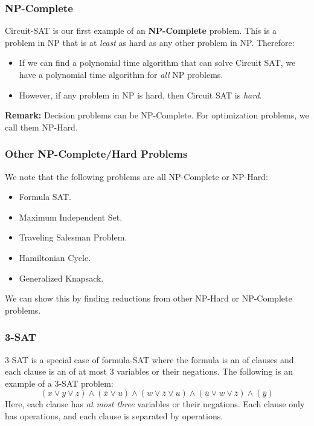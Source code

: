 \documentclass[letterpaper]{article}
\begin{document}
\subsubsection{NP-Complete}
Circuit-SAT is our first example of an \textbf{NP-Complete} problem. This is a problem in NP that is at \emph{least} as hard as any other problem in NP. Therefore: 
\begin{itemize}
    \item If we can find a polynomial time algorithm that can solve Circuit SAT, we have a polynomial time algorithm for \emph{all} NP problems. 
    \item However, if any problem in NP is hard, then Circuit SAT is \emph{hard}.
\end{itemize}
\textbf{Remark:} Decision problems can be NP-Complete. For optimization problems, we call them NP-Hard.

\subsubsection{Other NP-Complete/Hard Problems}
We note that the following problems are all NP-Complete or NP-Hard: 
\begin{itemize}
    \item Formula SAT. 
    \item Maximum Independent Set. 
    \item Traveling Salesman Problem. 
    \item Hamiltonian Cycle. 
    \item Generalized Knapsack. 
\end{itemize}
We can show this by finding reductions from other NP-Hard or NP-Complete problems. 

\subsubsection{3-SAT}
3-SAT is a special case of formula-SAT where the formula is an  of clauses and each clause is an  of at most 3 variables or their negations. The following is an example of a 3-SAT problem: 
\[(x \lor y \lor z) \land (\overline{x} \lor u) \land (w \lor \overline{z} \lor u) \land (\overline{u} \lor w \lor \overline{z}) \land (\overline{y})\]
Here, each clause has \emph{at most three} variables or their negations. Each clause only has  operations, and each clause is separated by  operations. 
\end{document}
